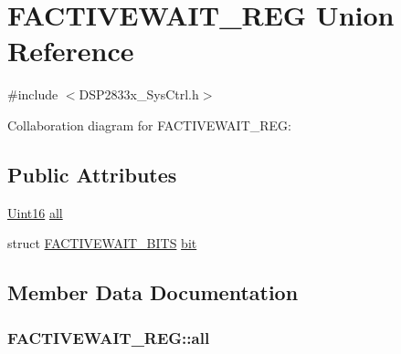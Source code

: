 \hypertarget{union_f_a_c_t_i_v_e_w_a_i_t___r_e_g}{}\section{F\+A\+C\+T\+I\+V\+E\+W\+A\+I\+T\+\_\+\+R\+E\+G Union Reference}
\label{union_f_a_c_t_i_v_e_w_a_i_t___r_e_g}


{\ttfamily \#include $<$D\+S\+P2833x\+\_\+\+Sys\+Ctrl.\+h$>$}



Collaboration diagram for F\+A\+C\+T\+I\+V\+E\+W\+A\+I\+T\+\_\+\+R\+E\+G\+:
\subsection*{Public Attributes}
\begin{DoxyCompactItemize}
\item 
\hyperlink{_d_s_p2833x___device_8h_a59a9f6be4562c327cbfb4f7e8e18f08b}{Uint16} \hyperlink{union_f_a_c_t_i_v_e_w_a_i_t___r_e_g_a47ada74d1099cebe7f42a4c21183c25c}{all}
\item 
struct \hyperlink{struct_f_a_c_t_i_v_e_w_a_i_t___b_i_t_s}{F\+A\+C\+T\+I\+V\+E\+W\+A\+I\+T\+\_\+\+B\+I\+T\+S} \hyperlink{union_f_a_c_t_i_v_e_w_a_i_t___r_e_g_ab9ddc5bbc54ac32460e14faf81728c09}{bit}
\end{DoxyCompactItemize}


\subsection{Member Data Documentation}
\hypertarget{union_f_a_c_t_i_v_e_w_a_i_t___r_e_g_a47ada74d1099cebe7f42a4c21183c25c}{}
\subsubsection[{all}]{ F\+A\+C\+T\+I\+V\+E\+W\+A\+I\+T\+\_\+\+R\+E\+G\+::all}\label{union_f_a_c_t_i_v_e_w_a_i_t___r_e_g_a47ada74d1099cebe7f42a4c21183c25c}
\hypertarget{union_f_a_c_t_i_v_e_w_a_i_t___r_e_g_ab9ddc5bbc54ac32460e14faf81728c09}{}
